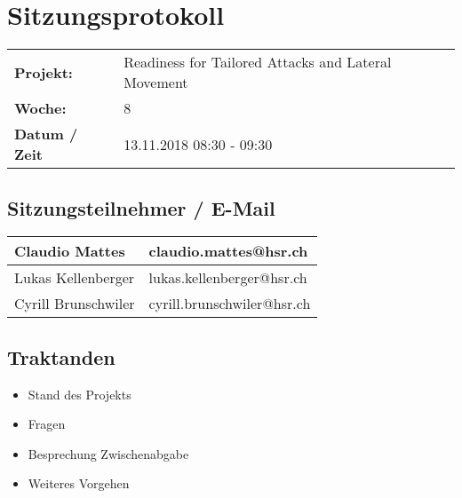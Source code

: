 \newcommand{\TITLE}{Readiness for Tailored Attacks and Lateral Movement Detection}
\newcommand{\REVIEW}{Weekly Meeting}
\newcommand{\VERSION}{0.0}





\section*{Sitzungsprotokoll}

\begin{tabular}{p{4cm} p{12cm}}
    \textbf{Projekt:} & Readiness for Tailored Attacks and Lateral Movement  \\
    \textbf{Woche:} & 8 \\
    \textbf{Datum / Zeit} & 13.11.2018 08:30 - 09:30 \\
\end{tabular}

\subsection*{Sitzungsteilnehmer / E-Mail}
\begin{table}[H]
    \centering
    \begin{tabular}{p{4cm} p{12cm}} \hline
        Claudio Mattes & claudio.mattes@hsr.ch \\ \hline
        Lukas Kellenberger & lukas.kellenberger@hsr.ch \\ \hline
        Cyrill Brunschwiler & cyrill.brunschwiler@hsr.ch \\ \hline
    \end{tabular}
\end{table}

\vspace{1cm}

\subsection*{Traktanden}
\begin{itemize}
    \item Stand des Projekts
    \item Fragen
    \item Besprechung Zwischenabgabe
    \item Weiteres Vorgehen
\end{itemize}

\clearpage


